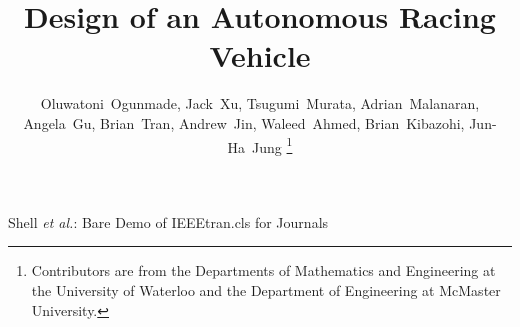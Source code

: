 \documentclass[11pt,journal]{IEEEtran}
\begin{document}
%
\title{Design of an Autonomous Racing Vehicle}
%
%
%

\author{Oluwatoni~Ogunmade, Jack~Xu, Tsugumi~Murata, Adrian~Malanaran,  Angela~Gu, Brian~Tran, Andrew~Jin, Waleed~Ahmed, Brian~Kibazohi, Jun-Ha~Jung
\thanks{Contributors are from the Departments of Mathematics and Engineering at the University of Waterloo and the Department of Engineering at McMaster University.}}

% 
%



%
{Shell \MakeLowercase{\textit{et al.}}: Bare Demo of IEEEtran.cls for Journals}
% 
\end{document}
